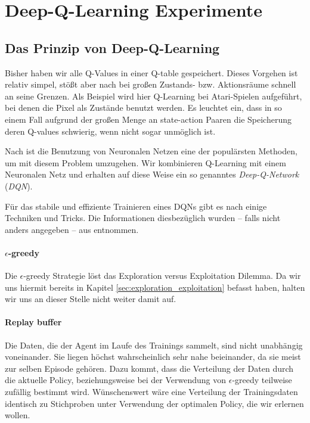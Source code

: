 \section{Deep-Q-Learning Experimente}
\subsection{Das Prinzip von Deep-Q-Learning} \label{sec:deepQPrinciple}
Bisher haben wir alle Q-Values in einer Q-table gespeichert. Dieses Vorgehen ist relativ simpel, stößt aber nach \cite{11_maxim2018deeprl} bei großen Zustands- bzw. Aktionsräume schnell an seine Grenzen. Als Beispiel wird hier Q-Learning bei Atari-Spielen aufgeführt, bei denen die Pixel als Zustände benutzt werden. Es leuchtet ein, dass in so einem Fall aufgrund der großen Menge an state-action Paaren die Speicherung deren Q-values schwierig, wenn nicht sogar unmöglich ist.

Nach \cite{11_maxim2018deeprl} ist die Benutzung von Neuronalen Netzen eine der populärsten Methoden, um mit diesem Problem umzugehen. Wir kombinieren Q-Learning mit einem Neuronalen Netz und erhalten auf diese Weise ein so genanntes \textit{Deep-Q-Network} (\textit{DQN}).

Für das stabile und effiziente Trainieren eines DQNs gibt es nach \cite{11_maxim2018deeprl} einige Techniken und Tricks. Die Informationen diesbezüglich wurden -- falls nicht anders angegeben -- aus \cite{11_maxim2018deeprl} entnommen.

\paragraph{$ \epsilon $-greedy}
Die $ \epsilon $-greedy Strategie löst das Exploration versus Exploitation Dilemma. Da wir uns hiermit bereits in Kapitel \ref{sec:exploration_exploitation} befasst haben, halten wir uns an dieser Stelle nicht weiter damit auf.

\paragraph{Replay buffer}
Die Daten, die der Agent im Laufe des Trainings sammelt, sind nicht unabhängig voneinander. Sie liegen höchst wahrscheinlich sehr nahe beieinander, da sie meist zur selben Episode gehören. Dazu kommt, dass die Verteilung der Daten durch die aktuelle Policy, beziehungsweise bei der Verwendung von $ \epsilon $-greedy teilweise zufällig bestimmt wird. Wünschenswert wäre eine Verteilung der Trainingsdaten identisch zu Stichproben unter Verwendung der optimalen Policy, die wir erlernen wollen.

